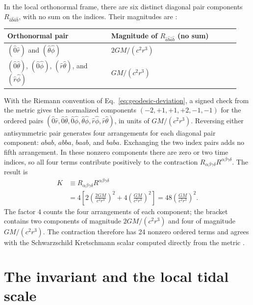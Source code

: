 \documentclass[12pt]{article}
\begin{document}
In the local orthonormal frame, there are six distinct diagonal pair components $R_{\hat a\hat b\hat a\hat b}$, with no sum on the indices. Their magnitudes are \cite{HamiltonGR}:
\begin{center}
\small
\begin{tabular}{@{}p{0.42\linewidth}p{0.52\linewidth}@{}}
  \toprule
  Orthonormal pair & Magnitude of $R_{\hat a\hat b\hat a\hat b}$ (no sum) \\
  \midrule
  $(\hat 0\hat r)$ and $(\hat\theta\hat\phi)$
    & $2GM/(c^2r^3)$ \\
  $(\hat 0\hat\theta)$, $(\hat 0\hat\phi)$,
  $(\hat r\hat\theta)$, and $(\hat r\hat\phi)$
    & $GM/(c^2r^3)$ \\
  \bottomrule
\end{tabular}
\end{center}
With the Riemann convention of Eq.~\eqref{eq:geodesic-deviation}, a signed check from the metric gives the normalized components $(-2,+1,+1,+2,-1,-1)$ for the ordered pairs $(\hat 0\hat r,\hat 0\hat\theta,\hat 0\hat\phi,\hat\theta\hat\phi,\hat r\hat\phi,\hat r\hat\theta)$, in units of $GM/(c^2r^3)$. Reversing either antisymmetric pair generates four arrangements for each diagonal pair component: $abab$, $abba$, $baab$, and $baba$. Exchanging the two index pairs adds no fifth arrangement. In these nonzero components there are zero or two time indices, so all four terms contribute positively to the contraction $R_{\alpha\beta\gamma\delta}R^{\alpha\beta\gamma\delta}$. The result is
\begin{align}
  K&\equiv R_{\alpha\beta\gamma\delta}
                 R^{\alpha\beta\gamma\delta}\\
   &=4\left[
      2\left(\frac{2GM}{c^2r^3}\right)^2
      +4\left(\frac{GM}{c^2r^3}\right)^2
     \right]
    =48\left(\frac{GM}{c^2r^3}\right)^2.
  \label{eq:kretschmann}
\end{align}
The factor $4$ counts the four arrangements of each component; the bracket contains two components of magnitude $2GM/(c^2r^3)$ and four of magnitude $GM/(c^2r^3)$. The contraction therefore has 24 nonzero ordered terms and agrees with the Schwarzschild Kretschmann scalar computed directly from the metric \cite{TongGR}.

\section{The invariant and the local tidal scale}
\label{sec:invariant}
\end{document}
